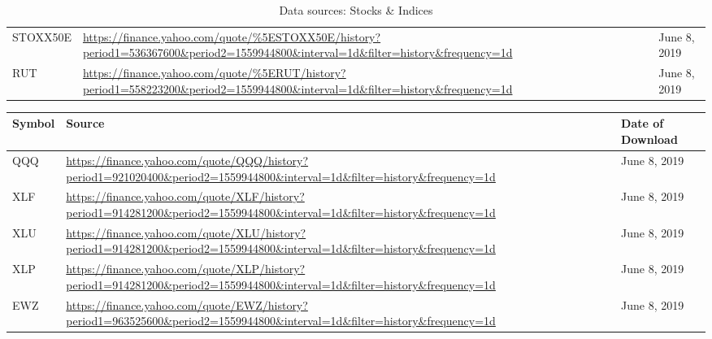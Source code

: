 \documentclass[12pt, a4paper]{article}
\begin{document}
\begin{table}[H]
\begin{tabular}{p{3.0cm} p{10.0cm}l}
        STOXX50E                                                                    & \url{https://finance.yahoo.com/quote/\%5ESTOXX50E/history?period1=536367600\&period2=1559944800\&interval=1d\&filter=history\&frequency=1d} & June 8, 2019              \\
        RUT                                                                         & \url{https://finance.yahoo.com/quote/\%5ERUT/history?period1=558223200\&period2=1559944800\&interval=1d\&filter=history\&frequency=1d}      & June 8, 2019              \\ \hline
        \end{tabular}
        \caption{Data sources: Stocks \& Indices}
        \label{tbl:datasets_stocks}
    \end{table}
    
        \begin{table}[H]
    \centering
        \begin{tabular}{p{3.0cm} p{10.0cm}l}
        \hline
        \textbf{Symbol}                                                             & \textbf{Source}                                                                                                                                              & \textbf{Date of Download} \\ \hline
        QQQ                                                                         & \url{https://finance.yahoo.com/quote/QQQ/history?period1=921020400\&period2=1559944800\&interval=1d\&filter=history\&frequency=1d}          & June 8, 2019              \\
        XLF                                                                         & \url{https://finance.yahoo.com/quote/XLF/history?period1=914281200\&period2=1559944800\&interval=1d\&filter=history\&frequency=1d}          & June 8, 2019              \\
        XLU                                                                         & \url{https://finance.yahoo.com/quote/XLU/history?period1=914281200\&period2=1559944800\&interval=1d\&filter=history\&frequency=1d}          & June 8, 2019              \\
        XLP                                                                         & \url{https://finance.yahoo.com/quote/XLP/history?period1=914281200\&period2=1559944800\&interval=1d\&filter=history\&frequency=1d}          & June 8, 2019              \\
        EWZ                                                                         & \url{https://finance.yahoo.com/quote/EWZ/history?period1=963525600\&period2=1559944800\&interval=1d\&filter=history\&frequency=1d}          & June 8, 2019              \\

\end{tabular}
\end{table}
\end{document}
